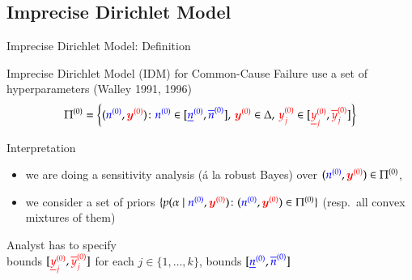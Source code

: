 \documentclass{beamer}
\def\rot#1{{\color{red}#1}}
\def\gruen#1{{\color{blue}#1}}
\def\byzr{\rot{\byz}}
\def\yzjr{\rot{y\uz_j}}
\def\yzjlr{\rot{\ul{y}\uz_j}}
\def\yzjur{\rot{\ol{y}\uz_j}}
\def\nzg{\gruen{\nz}}
\def\nzlg{\gruen{\nzl}}
\def\nzug{\gruen{\nzu}}
\def\PZc{\Pi\uz}
\begin{document}
\subsection{Imprecise Dirichlet Model}

\begin{frame}{Imprecise Dirichlet Model: Definition}
\begin{block}{Imprecise Dirichlet Model (IDM) for Common-Cause Failure}
use a \alert{set of hyperparameters}
    (Walley 1991, 1996)
    \begin{align*}
      \PZc
      =
      \left\{
        (\nzg,\byzr)
        \colon
        \nzg\in[\nzlg,\nzug],\,
        \byzr\in\Delta,\,
        \yzjr\in[\yzjlr,\yzjur]
      \right\}
    \end{align*}
\end{block}
\begin{block}{Interpretation}
\begin{itemize}
  \item we are doing a \alert{sensitivity analysis} (\'a la robust Bayes) over $(\nzg,\byzr) \in \PZc$,
  \item we consider a \alert{set of priors} $\{p(\alpha\mid\nzg,\byzr) \colon (\nzg,\byzr) \in \PZc\}$
  (resp.\ all convex mixtures of them)
\end{itemize}
\end{block}
Analyst has to specify \\
    bounds $[\yzjlr,\yzjur]$ for each $j\in\{1,\dots,k\}$, %
    bounds $[\nzlg,\nzug]$
\end{frame}
\end{document}
